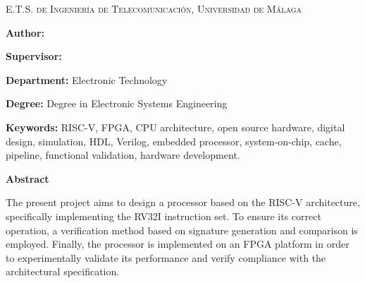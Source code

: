 
\pagestyle{fancy}

\begin{center}
	\scshape
	E.T.S. de Ingeniería de Telecomunicación, Universidad de Málaga
\end{center}

\bigskip

\begin{center}
	\Large \scshape
	\textbf{\tfgtitlenameENG}
\end{center}

\bigskip \bigskip \bigskip

\begin{minipage}{\textwidth}

\textbf{Author:} \tfgauthorname

\medskip

\textbf{Supervisor:} \tfgtutorname


\medskip

\textbf{Department:} Electronic Technology

\medskip

\textbf{Degree:} Degree in Electronic Systems Engineering

\medskip

\textbf{Keywords:} RISC-V, FPGA, CPU architecture, open source hardware, digital design, simulation, HDL, Verilog, embedded processor, system-on-chip, cache, pipeline, functional validation, hardware development.

\bigskip \bigskip


\end{minipage}

\begin{center}
	\textbf{Abstract}
\end{center}

The present project aims to design a processor based on the RISC-V architecture, specifically implementing the RV32I instruction set. To ensure its correct operation, a verification method based on signature generation and comparison is employed. Finally, the processor is implemented on an FPGA platform in order to experimentally validate its performance and verify compliance with the architectural specification.

\blankpage
